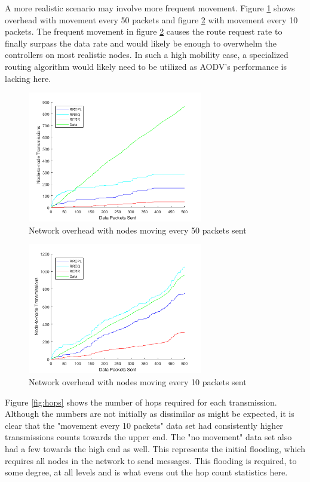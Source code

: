 \documentclass[conference]{IEEEtran}
\begin{document}
A more realistic scenario may involve more frequent movement. Figure \ref{fig:movement_50} shows overhead with movement every 50 packets and figure \ref{fig:movement_10} with movement every 10 packets. The frequent movement in figure \ref{fig:movement_10} causes the route request rate to finally surpass the data rate and would likely be enough to overwhelm the controllers on most realistic nodes. In such a high mobility case, a specialized routing algorithm would likely need to be utilized as AODV's performance is lacking here.

\begin{figure}[h]
	\centering
	\includegraphics[width=3in]{movement_50.png}
	\caption{Network overhead with nodes moving every 50 packets sent}
	\label{fig:movement_50}
\end{figure}

\begin{figure}[h]
	\centering
	\includegraphics[width=3in]{movement_10.png}
	\caption{Network overhead with nodes moving every 10 packets sent}
	\label{fig:movement_10}
\end{figure}

Figure \ref{fig:hops} shows the number of hops required for each transmission. Although the numbers are not initially as dissimilar as might be expected, it is clear that the "movement every 10 packets" data set had consistently higher transmissions counts towards the upper end. The "no movement" data set also had a few towards the high end as well. This represents the initial flooding, which requires all nodes in the network to send messages. This flooding is required, to some degree, at all levels and is what evens out the hop count statistics here.
\end{document}
